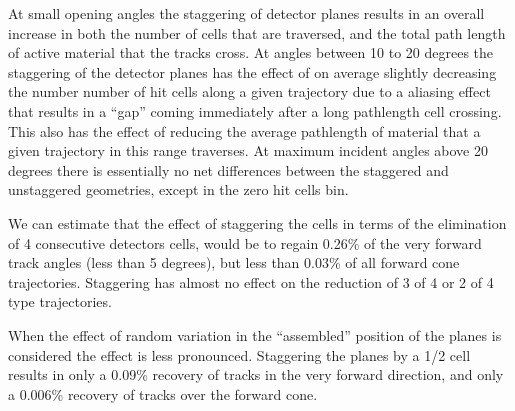 At small opening angles the staggering of detector planes results in an overall increase in both the number of cells that are traversed, and the total path length of active material that the tracks cross.  At angles between 10 to 20 degrees the staggering of the detector planes has the effect of on average slightly decreasing the number number of hit cells along a given trajectory due to a aliasing effect that results in a ``gap'' coming immediately after a long pathlength cell crossing.  This also has the effect of reducing the average pathlength of material that a given trajectory in this range traverses.  At maximum incident angles above 20 degrees there is essentially no net differences between the staggered and unstaggered geometries, except in the zero hit cells bin.

We can estimate that the effect of staggering the cells in terms of the elimination of 4 consecutive detectors cells, would be to regain 0.26\% of the very forward track angles (less than 5 degrees), but less than 0.03\% of all forward cone trajectories.  Staggering has almost no effect on the reduction of 3 of 4 or 2 of 4 type trajectories.

When the effect of random variation in the ``assembled'' position of the planes is considered the effect is less pronounced.  Staggering the planes by a 1/2 cell results in only a 0.09\% recovery of tracks in the very forward direction, and only a 0.006\% recovery of tracks over the forward cone.

